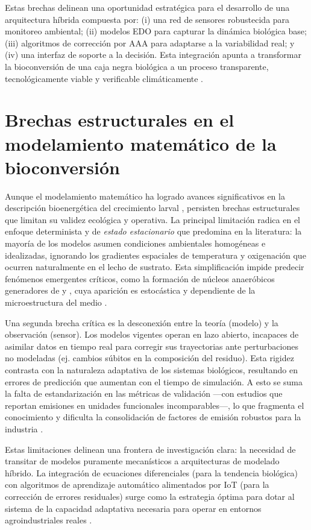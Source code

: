 Estas brechas delinean una oportunidad estratégica para el desarrollo de una arquitectura híbrida compuesta por: (i) una red de sensores robustecida para monitoreo ambiental; (ii) modelos EDO para capturar la dinámica biológica base; (iii) algoritmos de corrección por AAA para adaptarse a la variabilidad real; y (iv) una interfaz de soporte a la decisión. Esta integración apunta a transformar la bioconversión de una caja negra biológica a un proceso transparente, tecnológicamente viable y verificable climáticamente \parencite{kamilarisReviewPracticeBig2017}.

\section{Brechas estructurales en el modelamiento matemático de la bioconversión}

Aunque el modelamiento matemático ha logrado avances significativos en la descripción bioenergética del crecimiento larval \parencite{padmanabhaComprehensiveDynamicGrowth2020,eriksenDynamicModellingFeed2022}, persisten brechas estructurales que limitan su validez ecológica y operativa. La principal limitación radica en el enfoque determinista y de \textit{estado estacionario} que predomina en la literatura: la mayoría de los modelos asumen condiciones ambientales homogéneas e idealizadas, ignorando los gradientes espaciales de temperatura y oxigenación que ocurren naturalmente en el lecho de sustrato. Esta simplificación impide predecir fenómenos emergentes críticos, como la formación de núcleos anaeróbicos generadores de  y , cuya aparición es estocástica y dependiente de la microestructura del medio \parencite{bekkerImpactSubstrateMoisture2021a,rossiEstimatingDynamicsGreenhouse2024a}.

Una segunda brecha crítica es la desconexión entre la teoría (modelo) y la observación (sensor). Los modelos vigentes operan en lazo abierto, incapaces de asimilar datos en tiempo real para corregir sus trayectorias ante perturbaciones no modeladas (ej. cambios súbitos en la composición del residuo). Esta rigidez contrasta con la naturaleza adaptativa de los sistemas biológicos, resultando en errores de predicción que aumentan con el tiempo de simulación. A esto se suma la falta de estandarización en las métricas de validación —con estudios que reportan emisiones en unidades funcionales incomparables—, lo que fragmenta el conocimiento y dificulta la consolidación de factores de emisión robustos para la industria \parencite{fuhrmannComprehensiveIndustryrelevantBlack2025a}.

Estas limitaciones delinean una frontera de investigación clara: la necesidad de transitar de modelos puramente mecanísticos a arquitecturas de modelado híbrido. La integración de ecuaciones diferenciales (para la tendencia biológica) con algoritmos de aprendizaje automático alimentados por IoT (para la corrección de errores residuales) surge como la estrategia óptima para dotar al sistema de la capacidad adaptativa necesaria para operar en entornos agroindustriales reales \parencite{kobelskiProcessOptimizationBlack2024,liuOptimizingDataPipelines2023a}.